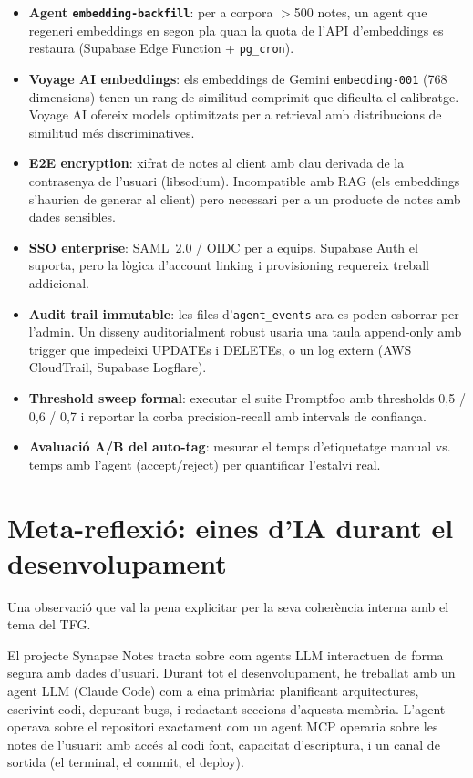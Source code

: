 \begin{itemize}
    \item \textbf{Agent \texttt{embedding-backfill}}: per a corpora $>$500 notes, un agent que regeneri embeddings en segon pla quan la quota de l'API d'embeddings es restaura (Supabase Edge Function + \texttt{pg\_cron}).
    \item \textbf{Voyage AI embeddings}: els embeddings de Gemini \texttt{embedding-001} (768 dimensions) tenen un rang de similitud comprimit que dificulta el calibratge. Voyage AI ofereix models optimitzats per a retrieval amb distribucions de similitud més discriminatives.
    \item \textbf{E2E encryption}: xifrat de notes al client amb clau derivada de la contrasenya de l'usuari (libsodium). Incompatible amb RAG (els embeddings s'haurien de generar al client) pero necessari per a un producte de notes amb dades sensibles.
    \item \textbf{SSO enterprise}: SAML~2.0 / OIDC per a equips. Supabase Auth el suporta, pero la lògica d'account linking i provisioning requereix treball addicional.
    \item \textbf{Audit trail immutable}: les files d'\texttt{agent\_events} ara es poden esborrar per l'admin. Un disseny auditorialment robust usaria una taula append-only amb trigger que impedeixi UPDATEs i DELETEs, o un log extern (AWS CloudTrail, Supabase Logflare).
    \item \textbf{Threshold sweep formal}: executar el suite Promptfoo amb thresholds 0{,}5 / 0{,}6 / 0{,}7 i reportar la corba precision-recall amb intervals de confiança.
    \item \textbf{Avaluació A/B del auto-tag}: mesurar el temps d'etiquetatge manual vs. temps amb l'agent (accept/reject) per quantificar l'estalvi real.
\end{itemize}

\section{Meta-reflexió: eines d'IA durant el desenvolupament}

Una observació que val la pena explicitar per la seva coherència interna amb el tema del TFG.

El projecte Synapse Notes tracta sobre com agents LLM interactuen de forma segura amb dades d'usuari. Durant tot el desenvolupament, he treballat amb un agent LLM (Claude Code) com a eina primària: planificant arquitectures, escrivint codi, depurant bugs, i redactant seccions d'aquesta memòria. L'agent operava sobre el repositori exactament com un agent MCP operaria sobre les notes de l'usuari: amb accés al codi font, capacitat d'escriptura, i un canal de sortida (el terminal, el commit, el deploy).

